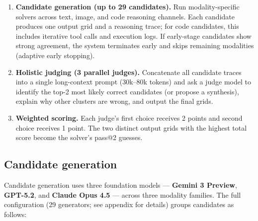 \documentclass[10pt]{article}
\begin{document}
\begin{enumerate}
\def\labelenumi{\arabic{enumi}.}
\item
  \textbf{Candidate generation (up to 29 candidates).} Run
  modality-specific solvers across text, image, and code reasoning
  channels. Each candidate produces one output grid and a reasoning
  trace; for code candidates, this includes iterative tool calls and
  execution logs. If early-stage candidates show strong agreement, the
  system terminates early and skips remaining modalities (adaptive early
  stopping).
\item
  \textbf{Holistic judging (3 parallel judges).} Concatenate all
  candidate traces into a single long-context prompt (30k--80k tokens)
  and ask a judge model to identify the top-2 most likely correct
  candidates (or propose a synthesis), explain why other clusters are
  wrong, and output the final grids.
\item
  \textbf{Weighted scoring.} Each judge's first choice receives 2 points
  and second choice receives 1 point. The two distinct output grids with
  the highest total score become the solver's pass@2 guesses.
\end{enumerate}

\hypertarget{candidate-generation}{%
\subsection{Candidate generation}\label{candidate-generation}}

Candidate generation uses three foundation models --- \textbf{Gemini 3
Preview}, \textbf{GPT-5.2}, and \textbf{Claude Opus 4.5} --- across
three modality families. The full configuration (29 generators; see
appendix for details) groups candidates as follows:
\end{document}
